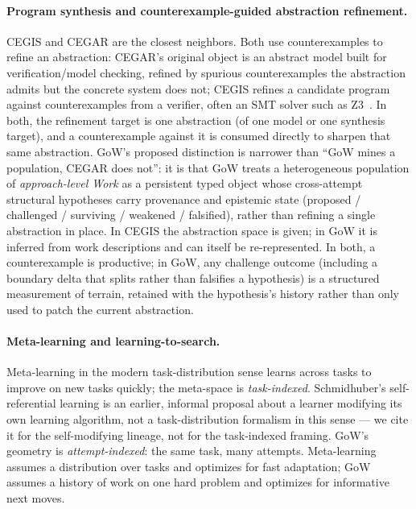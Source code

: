 \documentclass[11pt]{article}
\theoremstyle{gowthm}
\theoremstyle{gowplain}
\begin{document}
\paragraph{Program synthesis and counterexample-guided abstraction refinement.}
CEGIS \citep{solar-lezama2008program} and CEGAR \citep{clarke2000counterexample}
are the closest neighbors. Both use counterexamples to refine an abstraction:
CEGAR's original object is an abstract model built for verification/model
checking, refined by spurious counterexamples the abstraction admits but the
concrete system does not; CEGIS refines a candidate program against
counterexamples from a verifier, often an SMT solver such as
Z3~\citep{demoura2008z3}. In both, the refinement target is one
abstraction (of one model or one synthesis target), and a counterexample
against it is consumed directly to sharpen that same abstraction. GoW's
proposed distinction is narrower than ``GoW mines a population, CEGAR does
not'': it is that GoW treats a heterogeneous population of \emph{approach-level
Work} as a persistent typed object whose cross-attempt structural hypotheses
carry provenance and epistemic state (proposed / challenged / surviving /
weakened / falsified), rather than refining a single abstraction in place. In
CEGIS the abstraction space is given; in GoW it is inferred from work
descriptions and can itself be re-represented. In both, a counterexample is
productive; in GoW, any challenge outcome (including a boundary delta that
splits rather than falsifies a hypothesis) is a structured measurement of
terrain, retained with the hypothesis's history rather than only used to patch
the current abstraction.

\paragraph{Meta-learning and learning-to-search.}
Meta-learning in the modern task-distribution sense \citep{finn2017maml} learns across
tasks to improve on new tasks quickly; the meta-space is \emph{task-indexed}.
Schmidhuber's self-referential learning \citep{schmidhuber1987evolutionary} is
an earlier, informal proposal about a learner modifying its own learning
algorithm, not a task-distribution formalism in this sense --- we cite it for
the self-modifying lineage, not for the task-indexed framing.
GoW's geometry is \emph{attempt-indexed}: the same task, many attempts.
Meta-learning assumes a distribution over tasks and optimizes for fast adaptation;
GoW assumes a history of work on one hard problem and optimizes for informative
next moves.
\end{document}
